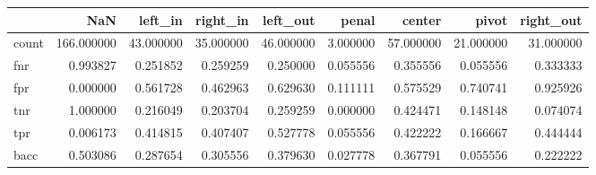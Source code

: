 \begin{tabular}{lrrrrrrrr}
\toprule
{} &         NaN &    left\_in &   right\_in &   left\_out &     penal &     center &      pivot &  right\_out \\
\midrule
count &  166.000000 &  43.000000 &  35.000000 &  46.000000 &  3.000000 &  57.000000 &  21.000000 &  31.000000 \\
fnr   &    0.993827 &   0.251852 &   0.259259 &   0.250000 &  0.055556 &   0.355556 &   0.055556 &   0.333333 \\
fpr   &    0.000000 &   0.561728 &   0.462963 &   0.629630 &  0.111111 &   0.575529 &   0.740741 &   0.925926 \\
tnr   &    1.000000 &   0.216049 &   0.203704 &   0.259259 &  0.000000 &   0.424471 &   0.148148 &   0.074074 \\
tpr   &    0.006173 &   0.414815 &   0.407407 &   0.527778 &  0.055556 &   0.422222 &   0.166667 &   0.444444 \\
bacc  &    0.503086 &   0.287654 &   0.305556 &   0.379630 &  0.027778 &   0.367791 &   0.055556 &   0.222222 \\
\bottomrule
\end{tabular}
